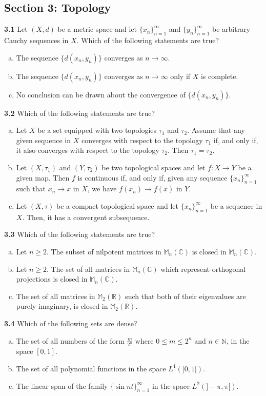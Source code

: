 \documentclass[11pt,a4paper]{article}
\newcommand{\N}{\mathbb{N}}
\newcommand{\R}{\mathbb{R}}
\newcommand{\C}{\mathbb{C}}
\newcommand{\M}{\mathbb{M}}
\newcommand{\examsec}[1]{%
  \subsection*{#1}
  \vspace{-2pt}
}
\newcommand{\qitem}[1]{\par\medskip\noindent\textbf{#1}\hspace{0.5em}}
\begin{document}
\examsec{Section 3: Topology}

\qitem{3.1} Let $(X, d)$ be a metric space and let $\{x_n\}_{n=1}^{\infty}$ and $\{y_n\}_{n=1}^{\infty}$ be arbitrary Cauchy sequences in $X$. Which of the following statements are true?
\begin{enumerate}[a.]
  \item The sequence $\{d(x_n, y_n)\}$ converges as $n \to \infty$.
  \item The sequence $\{d(x_n, y_n)\}$ converges as $n \to \infty$ only if $X$ is complete.
  \item No conclusion can be drawn about the convergence of $\{d(x_n, y_n)\}$.
\end{enumerate}

\qitem{3.2} Which of the following statements are true?
\begin{enumerate}[a.]
  \item Let $X$ be a set equipped with two topologies $\tau_1$ and $\tau_2$. Assume that any given sequence in $X$ converges with respect to the topology $\tau_1$ if, and only if, it also converges with respect to the topology $\tau_2$. Then $\tau_1 = \tau_2$.
  \item Let $(X, \tau_1)$ and $(Y, \tau_2)$ be two topological spaces and let $f : X \to Y$ be a given map. Then $f$ is continuous if, and only if, given any sequence $\{x_n\}_{n=1}^{\infty}$ such that $x_n \to x$ in $X$, we have $f(x_n) \to f(x)$ in $Y$.
  \item Let $(X, \tau)$ be a compact topological space and let $\{x_n\}_{n=1}^{\infty}$ be a sequence in $X$. Then, it has a convergent subsequence.
\end{enumerate}

\qitem{3.3} Which of the following statements are true?
\begin{enumerate}[a.]
  \item Let $n \ge 2$. The subset of nilpotent matrices in $\M_n(\C)$ is closed in $\M_n(\C)$.
  \item Let $n \ge 2$. The set of all matrices in $\M_n(\C)$ which represent orthogonal projections is closed in $\M_n(\C)$.
  \item The set of all matrices in $\M_2(\R)$ such that both of their eigenvalues are purely imaginary, is closed in $\M_2(\R)$.
\end{enumerate}

\qitem{3.4} Which of the following sets are dense?
\begin{enumerate}[a.]
  \item The set of all numbers of the form $\frac{m}{2^n}$ where $0 \le m \le 2^n$ and $n \in \N$, in the space $[0, 1]$.
  \item The set of all polynomial functions in the space $L^1(]0, 1[)$.
  \item The linear span of the family $\{\sin nt\}_{n=1}^{\infty}$ in the space $L^2(]-\pi, \pi[)$.
\end{enumerate}
\end{document}

